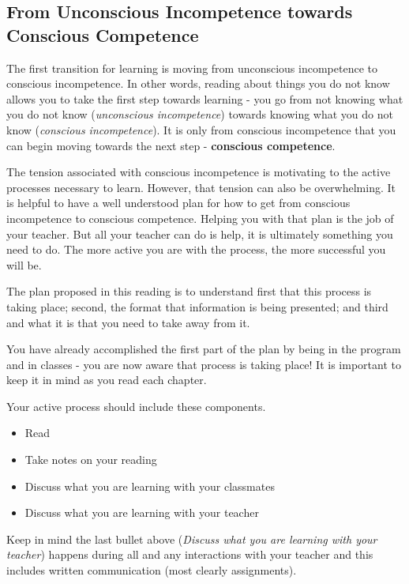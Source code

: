\subsection{From Unconscious Incompetence towards Conscious Competence}

The first transition for learning is moving from unconscious incompetence to conscious incompetence. In other words, reading about things you do not know allows you to take the first step towards learning - you go from not knowing what you do not know (\textit{unconscious incompetence}) towards knowing what you do not know (\textit{conscious incompetence}). It is only from conscious incompetence that you can begin moving towards the next step - \textbf{conscious competence}. 

The tension associated with conscious incompetence is motivating to the active processes necessary to learn. However, that tension can also be overwhelming. It is helpful to have a well understood plan for how to get from conscious incompetence to conscious competence. Helping you with that plan is the job of your teacher. But all your teacher can do is help, it is ultimately something you need to do. The more active you are with the process, the more successful you will be. \cite{brown_make_2014}

The plan proposed in this reading is to understand first that this process is taking place; second, the format that information is being presented; and third and what it is that you need to take away from it. 

You have already accomplished the first part of the plan by being in the program and in classes - you are now aware that process is taking place! It is important to keep it in mind as you read each chapter. 

Your active process should include these components. 

\begin{itemize}
\item Read
\item Take notes on your reading
\item Discuss what you are learning with your classmates
\item Discuss what you are learning with your teacher
\end{itemize}

Keep in mind the last bullet above (\textit{Discuss what you are learning with your teacher}) happens during all and any interactions with your teacher and this includes written communication (most clearly assignments).

